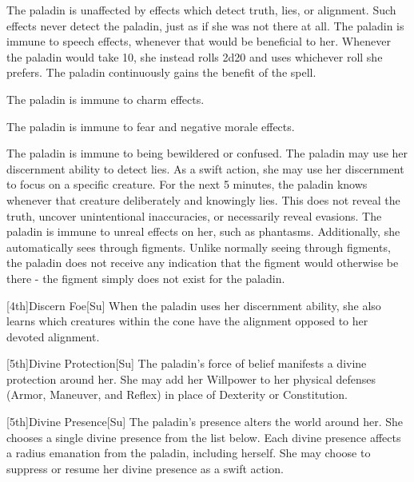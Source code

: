 The paladin is unaffected by effects which detect truth, lies, or alignment.
Such effects never detect the paladin, just as if she was not there at all.
The paladin is immune to speech effects, whenever that would be beneficial to her.
Whenever the paladin would take 10, she instead rolls 2d20 and uses whichever roll she prefers.
 The paladin continuously gains the benefit of the 
spell.

The paladin is immune to charm effects.

The paladin is immune to fear and negative morale effects.

The paladin is immune to being bewildered or confused.
The paladin may use her discernment ability to detect lies.
As a swift action, she may use her discernment to focus on a specific creature.
For the next 5 minutes, the paladin knows whenever that creature deliberately and knowingly lies.
This does not reveal the truth, uncover unintentional inaccuracies, or necessarily reveal evasions.
The paladin is immune to unreal effects on her, such as phantasms.
Additionally, she automatically sees through figments.
Unlike normally seeing through figments, the paladin does not receive any indication that the figment would otherwise be there - the figment simply does not exist for the paladin.

[4th]{Discern Foe}[Su]
When the paladin uses her discernment ability, she also learns which creatures within the cone have the alignment opposed to her devoted alignment.

[5th]{Divine Protection}[Su]
The paladin's force of belief manifests a divine protection around her.
She may add her Willpower to her physical defenses (Armor, Maneuver, and Reflex) in place of Dexterity or Constitution.

[5th]{Divine Presence}[Su]
The paladin's presence alters the world around her.
She chooses a single divine presence from the list below.
Each divine presence affects a \arealarge radius emanation from the paladin, including herself.
She may choose to suppress or resume her divine presence as a swift action.

